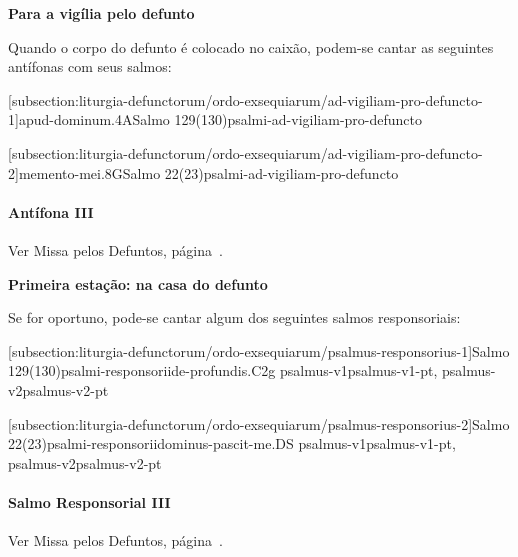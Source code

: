 \def\Prefix{subsection:liturgia-defunctorum/ordo-exsequiarum}

\begin{center}
  \textbf{\large Para a vigília pelo defunto}
\end{center}

\begin{rubrica}
  Quando o corpo do defunto é colocado no caixão, podem-se cantar as seguintes antífonas com seus salmos:
\end{rubrica}

[\Prefix/ad-vigiliam-pro-defuncto-1]{apud-dominum.4A}{Salmo 129(130)}{psalmi-ad-vigiliam-pro-defuncto}

\AllowPageFlush

[\Prefix/ad-vigiliam-pro-defuncto-2]{memento-mei.8G}{Salmo 22(23)}{psalmi-ad-vigiliam-pro-defuncto}

\paragraph{Antífona III}
\begin{rubrica}
  Ver Missa pelos Defuntos, página~\pageref{subsection:liturgia-defunctorum/missa-pro-defunctis/offertorium-2}.
\end{rubrica}

\begin{center}
  \textbf{\Large Primeira estação: na casa do defunto}
\end{center}

\begin{rubrica}
  Se for oportuno, pode-se cantar algum dos seguintes salmos responsoriais:
\end{rubrica}

[\Prefix/psalmus-responsorius-1]{Salmo 129(130)}{psalmi-responsorii}{de-profundis.C2g}{%
  {psalmus-v1}{psalmus-v1-pt},
  {psalmus-v2}{psalmus-v2-pt}
}

\AllowPageFlush

[\Prefix/psalmus-responsorius-2]{Salmo 22(23)}{psalmi-responsorii}{dominus-pascit-me.DS}{%
  {psalmus-v1}{psalmus-v1-pt},
  {psalmus-v2}{psalmus-v2-pt}
}

\paragraph{Salmo Responsorial III}
\begin{rubrica}
  Ver Missa pelos Defuntos, página~\pageref{subsection:liturgia-defunctorum/missa-pro-defunctis/psalmus-responsorius-2}.
\end{rubrica}

